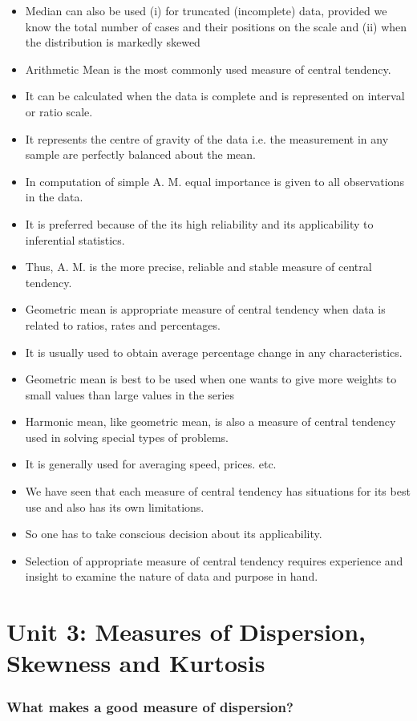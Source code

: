 \documentclass[
10pt, %
a4paper, %
]{report}
\begin{document}
\begin{itemize}
\item Median can also be used (i) for truncated (incomplete) data, provided we know the total number of cases and their positions on the scale and (ii) when the distribution is markedly skewed
\item Arithmetic Mean is the most commonly used measure of central tendency.
\item It can be calculated when the data is complete and is represented on interval or ratio scale.
\item It represents the centre of gravity of the data i.e. the measurement in any sample are perfectly balanced about the mean.
\item In computation of simple A. M. equal importance is given to all observations in the data.
\item It is preferred because of the its high reliability and its applicability to inferential statistics.
\item Thus, A. M. is the more precise, reliable and stable measure of central tendency.
\item Geometric mean is appropriate measure of central tendency when data is related to ratios, rates and percentages.
\item It is usually used to obtain average percentage change in any characteristics.
\item Geometric mean is best to be used when one wants to give more weights to small values than large values in the series
\item Harmonic mean, like geometric mean, is also a measure of central tendency used in solving special types of problems.
\item It is generally used for averaging speed, prices. etc.
\item We have seen that each measure of central tendency has situations for its best use and also has its own limitations.
\item So one has to take conscious decision about its applicability.
\item Selection of appropriate measure of central tendency requires experience and insight to examine the nature of data and purpose in hand.
\end{itemize}

\chapter*{Unit 3: Measures of Dispersion, Skewness and Kurtosis}

\subsection*{What makes a good measure of dispersion?}
\end{document}
